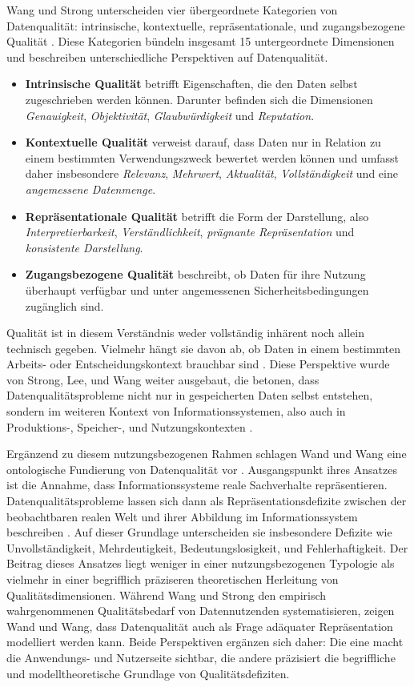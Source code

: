 Wang und Strong unterscheiden vier übergeordnete Kategorien von Datenqualität: intrinsische, kontextuelle, repräsentationale, und zugangsbezogene Qualität \cite{wang1996beyond}. Diese Kategorien bündeln insgesamt 15 untergeordnete Dimensionen und beschreiben unterschiedliche Perspektiven auf Datenqualität.

\begin{itemize}
    \item \textbf{Intrinsische Qualität} betrifft Eigenschaften, die den Daten selbst zugeschrieben werden können. Darunter befinden sich die Dimensionen \textit{Genauigkeit}, \textit{Objektivität}, \textit{Glaubwürdigkeit} und \textit{Reputation}.
    \item \textbf{Kontextuelle Qualität} verweist darauf, dass Daten nur in Relation zu einem bestimmten Verwendungszweck bewertet werden können und umfasst daher insbesondere \textit{Relevanz}, \textit{Mehrwert}, \textit{Aktualität}, \textit{Vollständigkeit} und eine \textit{angemessene Datenmenge}.
    \item \textbf{Repräsentationale Qualität} betrifft die Form der Darstellung, also \textit{Interpretierbarkeit}, \textit{Verständlichkeit}, \textit{prägnante Repräsentation} und \textit{konsistente Darstellung}.
    \item \textbf{Zugangsbezogene Qualität} beschreibt, ob Daten für ihre Nutzung überhaupt verfügbar und unter angemessenen Sicherheitsbedingungen zugänglich sind.
\end{itemize}

Qualität ist in diesem Verständnis weder vollständig inhärent noch allein technisch gegeben. Vielmehr hängt sie davon ab, ob Daten in einem bestimmten Arbeits- oder Entscheidungskontext brauchbar sind \cite{wang1996beyond}. Diese Perspektive wurde von Strong, Lee, und Wang weiter ausgebaut, die betonen, dass Datenqualitätsprobleme nicht nur in gespeicherten Daten selbst entstehen, sondern im weiteren Kontext von Informationssystemen, also auch in Produktions-, Speicher-, und Nutzungskontexten \cite{StrongLeeWang1997}.

Ergänzend zu diesem nutzungsbezogenen Rahmen schlagen Wand und Wang eine ontologische Fundierung von Datenqualität vor \cite{wand1996anchoring}. Ausgangspunkt ihres Ansatzes ist die Annahme, dass Informationssysteme reale Sachverhalte repräsentieren. Datenqualitätsprobleme lassen sich dann als Repräsentationsdefizite zwischen der beobachtbaren realen Welt und ihrer Abbildung im Informationssystem beschreiben \cite{wand1996anchoring}. Auf dieser Grundlage unterscheiden sie insbesondere Defizite wie Unvollständigkeit, Mehrdeutigkeit, Bedeutungslosigkeit, und Fehlerhaftigkeit. Der Beitrag dieses Ansatzes liegt weniger in einer nutzungsbezogenen Typologie als vielmehr in einer begrifflich präziseren theoretischen Herleitung von Qualitätsdimensionen. Während Wang und Strong den empirisch wahrgenommenen Qualitätsbedarf von Datennutzenden systematisieren, zeigen Wand und Wang, dass Datenqualität auch als Frage adäquater Repräsentation modelliert werden kann. Beide Perspektiven ergänzen sich daher: Die eine macht die Anwendungs- und Nutzerseite 
sichtbar, die andere präzisiert die begriffliche und modelltheoretische Grundlage von Qualitätsdefiziten.

